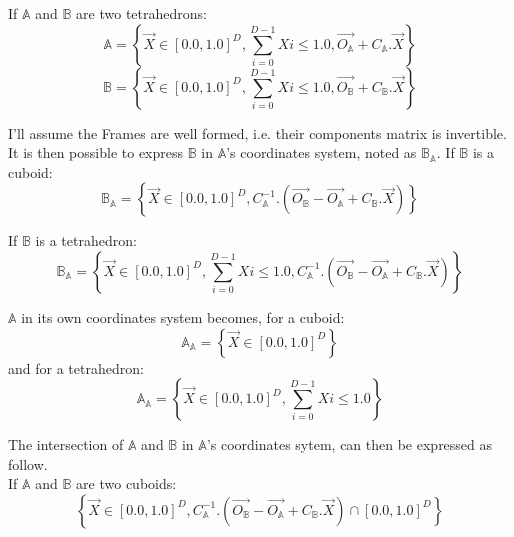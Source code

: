 \documentclass[12pt, a4paper]{article}
\begin{document}
If $\mathbb{A}$ and $\mathbb{B}$ are two tetrahedrons:
\begin{equation}
\mathbb{A}=\left\lbrace\overrightarrow{X}\in[0.0,1.0]^D,\sum_{i=0}^{D-1}Xi\le1.0,\overrightarrow{O_\mathbb{A}}+C_\mathbb{A}.\overrightarrow{X}\right\rbrace
\end{equation}
\begin{equation}
\mathbb{B}=\left\lbrace\overrightarrow{X}\in[0.0,1.0]^D,\sum_{i=0}^{D-1}Xi\le1.0,\overrightarrow{O_\mathbb{B}}+C_\mathbb{B}.\overrightarrow{X}\right\rbrace
\end{equation}

I'll assume the Frames are well formed, i.e. their components matrix is invertible. It is then possible to express $\mathbb{B}$ in $\mathbb{A}$'s coordinates system, noted as $\mathbb{B}_\mathbb{A}$. If $\mathbb{B}$ is a cuboid:
\begin{equation}
\mathbb{B}_\mathbb{A}=\left\lbrace\overrightarrow{X}\in[0.0,1.0]^D,C_\mathbb{A}^{-1}.(\overrightarrow{O_\mathbb{B}}-\overrightarrow{O_\mathbb{A}}+C_\mathbb{B}.\overrightarrow{X})\right\rbrace
\end{equation}

If $\mathbb{B}$ is a tetrahedron:
\begin{equation}
\mathbb{B}_\mathbb{A}=\left\lbrace\overrightarrow{X}\in[0.0,1.0]^D,\sum_{i=0}^{D-1}Xi\le1.0,C_\mathbb{A}^{-1}.(\overrightarrow{O_\mathbb{B}}-\overrightarrow{O_\mathbb{A}}+C_\mathbb{B}.\overrightarrow{X})\right\rbrace
\end{equation}

$\mathbb{A}$ in its own coordinates system becomes, for a cuboid:
\begin{equation}
\mathbb{A}_\mathbb{A}=\left\lbrace\overrightarrow{X}\in[0.0,1.0]^D\right\rbrace
\end{equation}
and for a tetrahedron:
\begin{equation}
\mathbb{A}_\mathbb{A}=\left\lbrace\overrightarrow{X}\in[0.0,1.0]^D,\sum_{i=0}^{D-1}Xi\le1.0\right\rbrace
\end{equation}

The intersection of $\mathbb{A}$ and $\mathbb{B}$ in $\mathbb{A}$'s coordinates sytem, can then be expressed as follow.\\

If $\mathbb{A}$ and $\mathbb{B}$ are two cuboids:
\begin{equation}
\left\lbrace\overrightarrow{X}\in[0.0,1.0]^D,C_\mathbb{A}^{-1}.\left(\overrightarrow{O_\mathbb{B}}-\overrightarrow{O_\mathbb{A}}+C_\mathbb{B}.\overrightarrow{X}\right)\cap[0.0,1.0]^D\right\rbrace
\end{equation}
\end{document}
